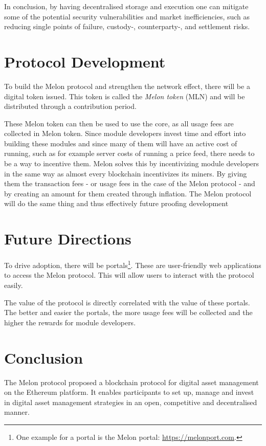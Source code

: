 \documentclass[9pt,oneside]{amsart}
\theoremstyle{plain}
\begin{document}
\begin{multicols}{2}
In conclusion, by having decentralised storage and execution one can mitigate some of the potential security vulnerabilities and market inefficiencies, such as reducing single points of failure, custody-, counterparty-, and settlement risks.

\section{Protocol Development}\label{sec:protocoldevelopment}

To build the Melon protocol and strengthen the network effect, there will be a digital token issued. This token is called the \textit{Melon token} (MLN) and will be distributed through a contribution period.

These Melon token can then be used to use the core, as all usage fees are collected in Melon token. Since module developers invest time and effort into building these modules and since many of them will have an active cost of running, such as for example server costs of running a price feed, there needs to be a way to incentive them. Melon solves this by incentivizing module developers in the same way as almost every blockchain incentivizes its miners. By giving them the transaction fees - or usage fees in the case of the Melon protocol - and by creating an amount for them created through inflation. The Melon protocol will do the same thing and thus effectively future proofing development

\section{Future Directions}\label{sec:futuredirections}

To drive adoption, there will be portals\footnote{One example for a portal is the Melon portal: \url{https://melonport.com}.}. These are user-friendly web applications to access the Melon protocol. This will allow users to interact with the protocol easily.

The value of the protocol is directly correlated with the value of these portals. The better and easier the portals, the more usage fees will be collected and the higher the rewards for module developers.

\section{Conclusion}\label{sec:conc}

The Melon protocol proposed a blockchain protocol for digital asset management on the Ethereum platform. It enables participants to set up, manage and invest in digital asset management strategies in an open, competitive and decentralised manner.


\end{multicols}
\end{document}
